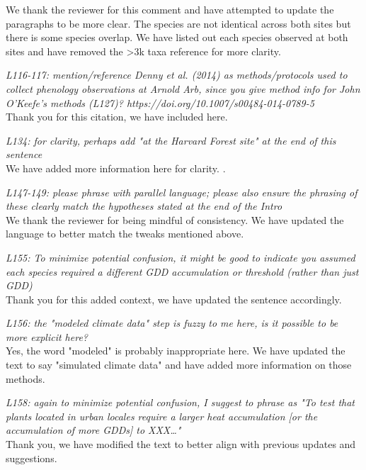 \documentclass[11pt,a4paper]{article}\usepackage[]{graphicx}\usepackage[]{color}
\begin{document}
We thank the reviewer for this comment and have attempted to update the paragraphs to be more clear. The species are not identical across both sites but there is some species overlap. We have listed out each species observed at both sites and have removed the >3k taxa reference for more clarity. 

\textit{L116-117: mention/reference Denny et al. (2014) as methods/protocols used to collect phenology observations at Arnold Arb, since you give method info for John O'Keefe's methods (L127)? https://doi.org/10.1007/s00484-014-0789-5}\\

Thank you for this citation, we have included here. 

\textit{L134: for clarity, perhaps add "at the Harvard Forest site" at the end of this sentence}\\

We have added more information here for clarity. .

\textit{L147-149: please phrase with parallel language; please also ensure the phrasing of these clearly match the hypotheses stated at the end of the Intro}\\

We thank the reviewer for being mindful of consistency. We have updated the language to better match the tweaks mentioned above. 

\textit{L155: To minimize potential confusion, it might be good to indicate you assumed each species required a different GDD accumulation or threshold (rather than just GDD)}\\

Thank you for this added context, we have updated the sentence accordingly. 

\textit{L156: the "modeled climate data" step is fuzzy to me here, is it possible to be more explicit here?}\\

Yes, the word "modeled" is probably inappropriate here. We have updated the text to say "simulated climate data" and have added more information on those methods. 

\textit{L158: again to minimize potential confusion, I suggest to phrase as "To test that plants located in urban locales require a larger heat accumulation [or the accumulation of more GDDs] to XXX…"}\\

Thank you, we have modified the text to better align with previous updates and suggestions. 
\end{document}
